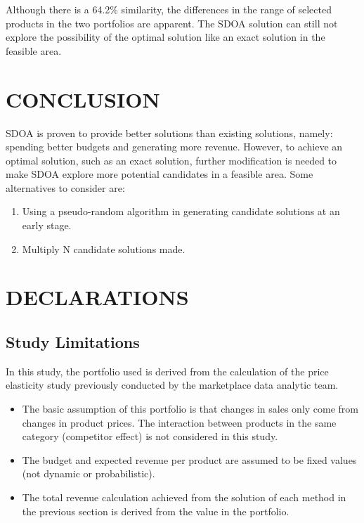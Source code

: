 \documentclass[preprint, 3p,
authoryear]{elsarticle} %
\providecommand{\tightlist}{%
  \setlength{\itemsep}{0pt}\setlength{\parskip}{0pt}}
\begin{document}
Although there is a 64.2\% similarity, the differences in the range of
selected products in the two portfolios are apparent. The SDOA solution
can still not explore the possibility of the optimal solution like an
exact solution in the feasible area.

\hypertarget{conclusion}{%
\section{CONCLUSION}\label{conclusion}}

SDOA is proven to provide better solutions than existing solutions,
namely: spending better budgets and generating more revenue. However, to
achieve an optimal solution, such as an exact solution, further
modification is needed to make SDOA explore more potential candidates in
a feasible area. Some alternatives to consider are:

\begin{enumerate}
\def\labelenumi{\arabic{enumi}.}
\tightlist
\item
  Using a pseudo-random algorithm in generating candidate solutions at
  an early stage.
\item
  Multiply N candidate solutions made.
\end{enumerate}

\hypertarget{declarations}{%
\section{DECLARATIONS}\label{declarations}}

\hypertarget{study-limitations}{%
\subsection{Study Limitations}\label{study-limitations}}

In this study, the portfolio used is derived from the calculation of the
price elasticity study previously conducted by the marketplace data
analytic team.

\begin{itemize}
\tightlist
\item
  The basic assumption of this portfolio is that changes in sales only
  come from changes in product prices. The interaction between products
  in the same category (competitor effect) is not considered in this
  study.
\item
  The budget and expected revenue per product are assumed to be fixed
  values (not dynamic or probabilistic).
\item
  The total revenue calculation achieved from the solution of each
  method in the previous section is derived from the value in the
  portfolio.
\end{itemize}
\end{document}
